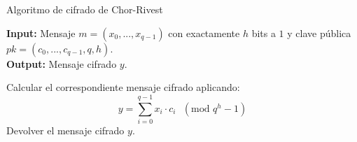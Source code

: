     \begin{algorithm}[H]
        \caption{Algoritmo de cifrado de Chor-Rivest}
        \textbf{Input:} Mensaje $m = (x_{0}, ... , x_{q-1})$ con exactamente $h$ bits a $1$ y clave pública $pk = (c_{0}, ... , c_{q-1}, q, h)$.\\
        \textbf{Output:} Mensaje cifrado $y$.
        \bigskip
        \begin{algorithmic}[1]
            \State Calcular el correspondiente mensaje cifrado aplicando:
            \begin{equation}
                y = \sum_{i=0}^{q-1} x_{i} \cdot c_{i} \text{ }( \text{mod } q^{h} - 1)
            \end{equation}
            \State Devolver el mensaje cifrado $y$.
        \end{algorithmic}
    \end{algorithm}
    

